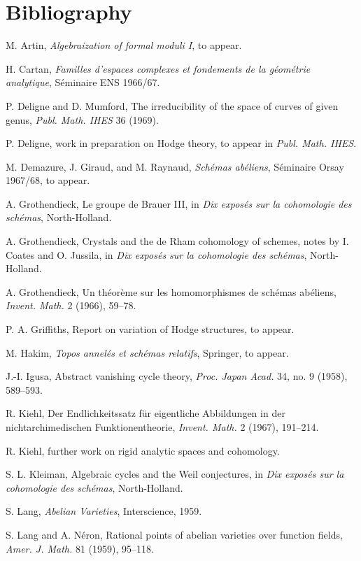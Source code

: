 \documentclass[12pt]{article}
\begin{document}
\section*{Bibliography}
\begin{enumerate}[label={[\arabic*]},leftmargin=2.5em]
\item M. Artin, \emph{Algebraization of formal moduli I}, to appear.
\item H. Cartan, \emph{Familles d'espaces complexes et fondements de la g\'eom\'etrie analytique}, S\'eminaire ENS 1966/67.
\item P. Deligne and D. Mumford, The irreducibility of the space of curves of given genus, \emph{Publ. Math. IHES} 36 (1969).
\item P. Deligne, work in preparation on Hodge theory, to appear in \emph{Publ. Math. IHES}.
\item M. Demazure, J. Giraud, and M. Raynaud, \emph{Sch\'emas ab\'eliens}, S\'eminaire Orsay 1967/68, to appear.
\item A. Grothendieck, Le groupe de Brauer III, in \emph{Dix expos\'es sur la cohomologie des sch\'emas}, North-Holland.
\item A. Grothendieck, Crystals and the de Rham cohomology of schemes, notes by I. Coates and O. Jussila, in \emph{Dix expos\'es sur la cohomologie des sch\'emas}, North-Holland.
\item A. Grothendieck, Un th\'eor\`eme sur les homomorphismes de sch\'emas ab\'eliens, \emph{Invent. Math.} 2 (1966), 59--78.
\item P. A. Griffiths, Report on variation of Hodge structures, to appear.
\item M. Hakim, \emph{Topos annel\'es et sch\'emas relatifs}, Springer, to appear.
\item J.-I. Igusa, Abstract vanishing cycle theory, \emph{Proc. Japan Acad.} 34, no. 9 (1958), 589--593.
\item R. Kiehl, Der Endlichkeitssatz f\"ur eigentliche Abbildungen in der nichtarchimedischen Funktionentheorie, \emph{Invent. Math.} 2 (1967), 191--214.
\item R. Kiehl, further work on rigid analytic spaces and cohomology.
\item S. L. Kleiman, Algebraic cycles and the Weil conjectures, in \emph{Dix expos\'es sur la cohomologie des sch\'emas}, North-Holland.
\item S. Lang, \emph{Abelian Varieties}, Interscience, 1959.
\item S. Lang and A. N\'eron, Rational points of abelian varieties over function fields, \emph{Amer. J. Math.} 81 (1959), 95--118.

\end{enumerate}
\end{document}
